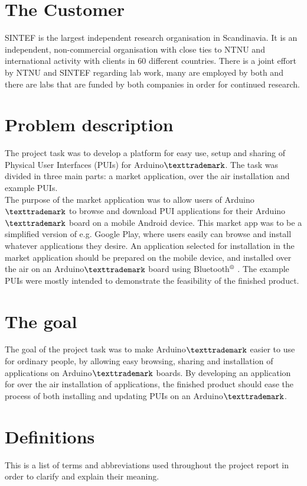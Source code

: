 \section{The Customer}
SINTEF is the largest independent research organisation in Scandinavia. It is an independent, non-commercial organisation with close ties to NTNU and international activity with clients in 60 different countries. There is a joint effort by NTNU and SINTEF regarding lab work, many are employed by both and there are labs that are funded by both companies in order for continued research.

\section{Problem description}
The project task was to develop a platform for easy use, setup and sharing of Physical User Interfaces (PUIs) for Arduino$\texttrademark$. The task was divided in three main parts: a market application, over the air installation and example PUIs.\\
\newline
The purpose of the market application was to allow users of Arduino$\texttrademark$ to browse and download PUI applications for their Arduino$\texttrademark$ board on a mobile Android device. This market app was to be a simplified version of e.g. Google Play, where users easily can browse and install whatever applications they desire. An application selected for installation in the market application should be prepared on the mobile device, and installed over the air on an Arduino$\texttrademark$ board using Bluetooth$\textsuperscript{\textregistered}$ . The example PUIs were mostly intended to demonstrate the feasibility of the finished product.

\section{The goal}
The goal of the project task was to make Arduino$\texttrademark$ easier to use for ordinary people, by allowing easy browsing, sharing and installation of applications on Arduino$\texttrademark$ boards. By developing an application for over the air installation of applications, the finished product should ease the process of both installing and updating PUIs on an Arduino$\texttrademark$.


\section{Definitions}
This is a list of terms and abbreviations used throughout the project report in order to clarify and explain their meaning.

